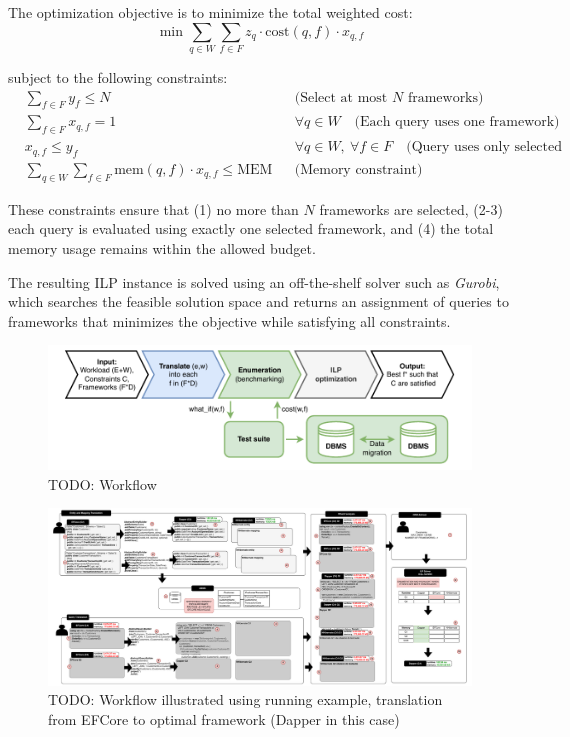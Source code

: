 The optimization objective is to minimize the total weighted cost:
$$\min \sum_{q \in W} \sum_{f \in F} z_q \cdot \text{cost}(q, f) \cdot x_{q,f}$$

\noindent
subject to the following constraints:
\begin{align*}
&\sum_{f \in F} y_f \leq N && \text{(Select at most $N$ frameworks)} \\
&\sum_{f \in F} x_{q,f} = 1 && \forall q \in W \quad \text{(Each query uses one framework)} \\
&x_{q,f} \leq y_f && \forall q \in W,\ \forall f \in F \quad \text{(Query uses only selected frameworks)} \\
&\sum_{q \in W} \sum_{f \in F} \text{mem}(q,f) \cdot x_{q,f} \leq \text{MEM} && \text{(Memory constraint)}
\end{align*}

These constraints ensure that (1) no more than $N$ frameworks are selected, (2-3) each query is evaluated using exactly one selected framework, and (4) the total memory usage remains within the allowed budget.

The resulting ILP instance is solved using an off-the-shelf solver such as \emph{Gurobi}, which searches the feasible solution space and returns an assignment of queries to frameworks that minimizes the objective while satisfying all constraints.

\begin{figure}
\centering
\includegraphics[scale=0.8]{thesis/img/thesis/ORM-workflow.pdf}
\caption{TODO: Workflow }
\label{fig:workflow}
\end{figure}

\begin{figure}
\centering
\includegraphics[width=\textwidth]{thesis/img/thesis/ORM-example.pdf}
\caption{TODO: Workflow illustrated using running example, translation from EFCore to optimal framework (Dapper in this case)}
\label{fig:example}
\end{figure}

